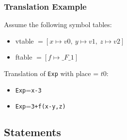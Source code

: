 \documentclass{beamer}
\newcommand{\codesize}{\footnotesize}
\newcommand{\cd}[1]{{{\codesize\tt #1}}}
\renewcommand{\emph}[1]{\textcolor{structure}{#1}}
\begin{document}
\begin{frame}[fragile]
	\frametitle{Translation Example}

Assume the following symbol tables:
\begin{itemize}
\item \emph{vtable} $ = [ x \mapsto v0,\ y \mapsto v1,\ z \mapsto v2 ] $
\item \emph{ftable} $ = [ f \mapsto \_F\_1 ] $
\end{itemize}
Translation of \cd{Exp} with place = $ t0 $:

\begin{itemize}

\item \cd{Exp}=\cd{x-3}

\pause \pause
\item \cd{Exp}=\cd{3+f(x-y,z)}
\end{itemize}

\end{frame}

\subsection{Statements}

\begin{frame}
	\tableofcontents[currentsubsection]
\end{frame}
\end{document}
